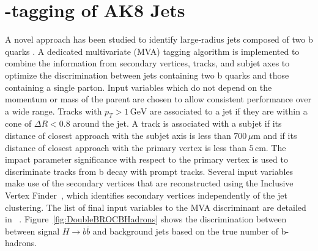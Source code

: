 \chapter{\bbbar-tagging of AK8 Jets}
\label{chap:bb}

A novel approach has been studied to identify large-radius jets composed of two b quarks \cite{CMS-PAS-BTV-15-002}. A dedicated multivariate (MVA) tagging algorithm is implemented to combine the information from secondary vertices, tracks, and subjet axes to optimize the discrimination between jets containing two b quarks and those containing a single parton. Input variables which do not depend on the momentum or mass of the parent are chosen to allow consistent performance over a wide range. Tracks with $p_{T}>1\,\textrm{GeV}$ are associated to a jet if they are within a cone of $\Delta R<0.8$ around the jet. A track is associated with a subjet if its distance of closest approach with the subjet axis is less than $700\,\mu\mathrm{m}$ and if its distance of closest approach with the primary vertex is less than $5\,\mathrm{cm}$. The impact parameter significance with respect to the primary vertex is used to discriminate tracks from b decay with prompt tracks. Several input variables make use of the secondary vertices that are reconstructed using the Inclusive Vertex Finder~\cite{CMS-PAS-BTV-15-001}, which identifies secondary vertices independently of the jet clustering. The list of final input variables to the MVA discriminant are detailed in ~\cite{CMS-PAS-BTV-15-002}.  Figure~\ref{fig:DoubleBROCBHadrons} shows the discrimination between between signal $H\rightarrow b\overline{b}$ and background jets based on the true number of b-hadrons.

